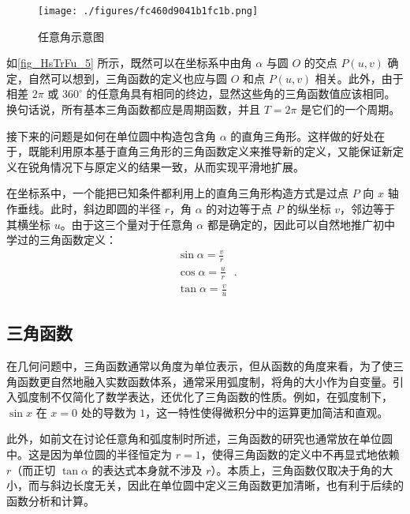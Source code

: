 \begin{figure}[ht]
\centering
\texttt{[image: ./figures/fc460d9041b1fc1b.png]}
\caption{任意角示意图} \label{fig_HsTrFu_5}
\end{figure}

如\autoref{fig_HsTrFu_5} 所示，既然可以在坐标系中由角 $\alpha$ 与圆 $O$ 的交点 $P(u,v)$ 确定，自然可以想到，三角函数的定义也应与圆 $O$ 和点 $P(u,v)$ 相关。此外，由于相差 $2\pi$ 或 $360^\circ$ 的任意角具有相同的终边，显然这些角的三角函数值应该相同。换句话说，所有基本三角函数都应是周期函数，并且 $T=2\pi$ 是它们的一个周期。

接下来的问题是如何在单位圆中构造包含角 $\alpha$ 的直角三角形。这样做的好处在于，既能利用原本基于直角三角形的三角函数定义来推导新的定义，又能保证新定义在锐角情况下与原定义的结果一致，从而实现平滑地扩展。

在坐标系中，一个能把已知条件都利用上的直角三角形构造方式是过点 $P$ 向 $x$ 轴作垂线。此时，斜边即圆的半径 $r$，角 $\alpha$ 的对边等于点 $P$ 的纵坐标 $v$，邻边等于其横坐标 $u$。由于这三个量对于任意角 $\alpha$ 都是确定的，因此可以自然地推广初中学过的三角函数定义：
\begin{equation}
\begin{array}{c} 
\displaystyle\sin\alpha = \frac{v}{r}\\
\displaystyle\cos\alpha = \frac{u}{r}\\
\displaystyle\tan\alpha = \frac{v}{u}
\end{array}~.
\end{equation}

\subsection{三角函数}

在几何问题中，三角函数通常以角度为单位表示，但从函数的角度来看，为了使三角函数更自然地融入实数函数体系，通常采用弧度制，将角的大小作为自变量。引入弧度制不仅简化了数学表达，还优化了三角函数的性质。例如，在弧度制下，$\sin x$ 在 $x=0$ 处的导数为 $1$，这一特性使得微积分中的运算更加简洁和直观。

此外，如前文在讨论任意角和弧度制时所述，三角函数的研究也通常放在单位圆中。这是因为单位圆的半径恒定为 $r=1$，使得三角函数的定义中不再显式地依赖 $r$（而正切 $\tan\alpha$ 的表达式本身就不涉及 $r$）。本质上，三角函数仅取决于角的大小，而与斜边长度无关，因此在单位圆中定义三角函数更加清晰，也有利于后续的函数分析和计算。

